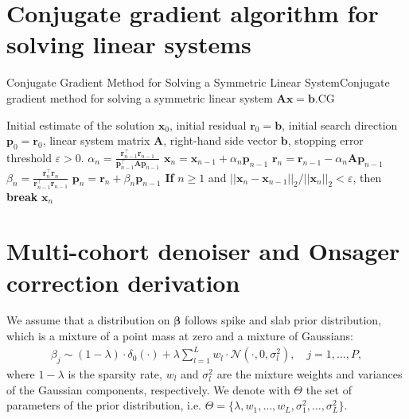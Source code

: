 \newpage

\section{Conjugate gradient algorithm for solving linear systems}
\label{supp:note4}
\begin{breakablealgorithm}{Conjugate Gradient Method for Solving a Symmetric Linear System}{Conjugate gradient method for solving a symmetric linear system $\bm{Ax}=\bm{b}$.}{CG}
    
\begin{algorithmic}[1]
         Initial estimate of the solution $\bm{x}_0$, initial residual $\bm{r}_0=\bm{b}$, initial search direction $\bm{p}_0 = \bm{r}_0$, linear system matrix $\bm{A}$, right-hand side vector $\bm{b}$, stopping error threshold $\varepsilon >0$.
            \STATE $\alpha_n = \frac{\bm r_{n-1}^\top \bm r_{n-1}}{\bm p_{n-1}^\top\bm A \bm p_{n-1}}$ 
            \STATE $\bm x_n = \bm x_{n-1} + \alpha_n \bm p_{n-1}$ 
            \STATE $\bm r_n = \bm r_{n-1} - \alpha_n \bm A \bm p_{n-1}$ 
            \STATE $\beta_n = \frac{\bm r_n^\top \bm r_n}{\bm r_{n-1}^\top \bm r_{n-1}}$ 
            \STATE $\bm p_n = \bm r_n + \beta_n \bm p_{n-1}$ 
            \STATE \textbf{If} $n \ge 1$ and $||\bm{x}_n - \bm{x}_{n-1}||_2 / ||\bm{x}_n||_2 < \varepsilon$, then \textbf{break}
        \ENDFOR
         $\bm{x}_n$ 
\end{algorithmic}
\end{breakablealgorithm}

\newpage

\section{Multi-cohort denoiser and Onsager correction derivation}
\label{supp:note3}

We assume that a distribution on $\bm{\beta}$ follows spike and slab prior distribution, which is a mixture of a point mass at zero and a mixture of Gaussians:
\begin{align}
    \beta_j \sim (1-\lambda) \cdot \delta_0(\cdot) + \lambda \sum_{l=1}^L w_l \cdot \mathcal{N}(\cdot, 0, \sigma_l^2), \quad j=1, \dots, P,
\end{align}
where $1-\lambda$ is the sparsity rate, $w_l$ and $\sigma_l^2$ are the mixture weights and variances of the Gaussian components, respectively. We denote with $\Theta$ the set of parameters of the prior distribution, i.e. $\Theta = \{\lambda, w_1, \dots, w_L, \sigma_1^2, \dots, \sigma_L^2\}$.

